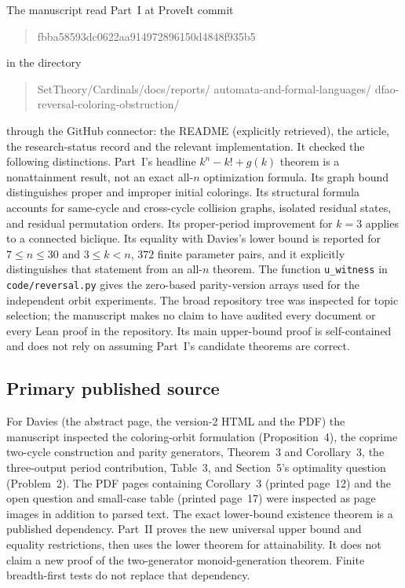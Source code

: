 \documentclass[11pt,a4paper]{article}
\numberwithin{equation}{section}
\theoremstyle{definition}
\theoremstyle{remark}
\begin{document}
The manuscript read Part~I at ProveIt commit
\begin{quote}\small\ttfamily
fbba58593dc0622aa914972896150d4848f935b5
\end{quote}
in the directory
\begin{quote}\small\ttfamily\raggedright
SetTheory/Cardinals/docs/reports/\allowbreak
automata-and-formal-languages/\allowbreak
dfao-reversal-coloring-obstruction/
\end{quote}
through the GitHub connector: the README (explicitly retrieved), the article,
the research-status record and the relevant implementation. It checked the
following distinctions. Part~I's headline $k^n-k!+g(k)$ theorem is a
nonattainment result, not an exact all-$n$ optimization formula. Its graph
bound distinguishes proper and improper initial colorings. Its structural
formula accounts for same-cycle and cross-cycle collision graphs, isolated
residual states, and residual permutation orders. Its proper-period
improvement for $k=3$ applies to a connected biclique. Its equality with
Davies's lower bound is reported for $7\le n\le30$ and $3\le k<n$, $372$
finite parameter pairs, and it explicitly distinguishes that statement from an
all-$n$ theorem. The function \texttt{u\_witness} in \texttt{code/reversal.py}
gives the zero-based parity-version arrays used for the independent orbit
experiments. The broad repository tree was inspected for topic selection; the
manuscript makes no claim to have audited every document or every Lean proof
in the repository. Its main upper-bound proof is self-contained and does not
rely on assuming Part~I's candidate theorems are correct.

\subsection{Primary published source}

For Davies \cite{Davies2017} (the abstract page, the version-2 HTML and the
PDF) the manuscript inspected the coloring-orbit formulation
(Proposition~4), the coprime two-cycle construction and parity generators,
Theorem~3 and Corollary~3, the three-output period contribution, Table~3, and
Section~5's optimality question (Problem~2). The PDF pages containing
Corollary~3 (printed page~12) and the open question and small-case table
(printed page~17) were inspected as page images in addition to parsed text.
The exact lower-bound existence theorem is a published dependency. Part~II
proves the new universal upper bound and equality restrictions, then uses the
lower theorem for attainability. It does not claim a new proof of the
two-generator monoid-generation theorem. Finite breadth-first tests do not
replace that dependency.
\end{document}
